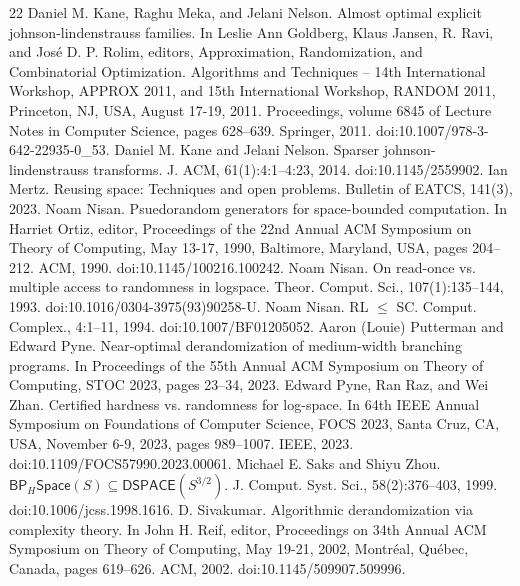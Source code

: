 \documentclass[10pt,a4paper]{article}
\begin{document}
\begin{thebibliography}{22}
 Daniel M. Kane, Raghu Meka, and Jelani Nelson. Almost optimal explicit johnson-lindenstrauss families. In Leslie Ann Goldberg, Klaus Jansen, R. Ravi, and José D. P. Rolim, editors, Approximation, Randomization, and Combinatorial Optimization. Algorithms and Techniques – 14th International Workshop, APPROX 2011, and 15th International Workshop, RANDOM 2011, Princeton, NJ, USA, August 17-19, 2011. Proceedings, volume 6845 of Lecture Notes in Computer Science, pages 628–639. Springer, 2011. doi:10.1007/978-3-642-22935-0\_53.
 Daniel M. Kane and Jelani Nelson. Sparser johnson-lindenstrauss transforms. J. ACM, 61(1):4:1–4:23, 2014. doi:10.1145/2559902.
 Ian Mertz. Reusing space: Techniques and open problems. Bulletin of EATCS, 141(3), 2023.
 Noam Nisan. Psuedorandom generators for space-bounded computation. In Harriet Ortiz, editor, Proceedings of the 22nd Annual ACM Symposium on Theory of Computing, May 13-17, 1990, Baltimore, Maryland, USA, pages 204–212. ACM, 1990. doi:10.1145/100216.100242.
 Noam Nisan. On read-once vs. multiple access to randomness in logspace. Theor. Comput. Sci., 107(1):135–144, 1993. doi:10.1016/0304-3975(93)90258-U.
 Noam Nisan. RL $\leq$ SC. Comput. Complex., 4:1–11, 1994. doi:10.1007/BF01205052.
 Aaron (Louie) Putterman and Edward Pyne. Near-optimal derandomization of medium-width branching programs. In Proceedings of the 55th Annual ACM Symposium on Theory of Computing, STOC 2023, pages 23–34, 2023.
 Edward Pyne, Ran Raz, and Wei Zhan. Certified hardness vs. randomness for log-space. In 64th IEEE Annual Symposium on Foundations of Computer Science, FOCS 2023, Santa Cruz, CA, USA, November 6-9, 2023, pages 989–1007. IEEE, 2023. doi:10.1109/FOCS57990.2023.00061.
 Michael E. Saks and Shiyu Zhou. $\mathsf{BP}_H\mathsf{Space}(S)\subseteq\mathsf{DSPACE}(S^{3/2})$. J. Comput. Syst. Sci., 58(2):376–403, 1999. doi:10.1006/jcss.1998.1616.
 D. Sivakumar. Algorithmic derandomization via complexity theory. In John H. Reif, editor, Proceedings on 34th Annual ACM Symposium on Theory of Computing, May 19-21, 2002, Montréal, Québec, Canada, pages 619–626. ACM, 2002. doi:10.1145/509907.509996.
\end{thebibliography}
\end{document}
